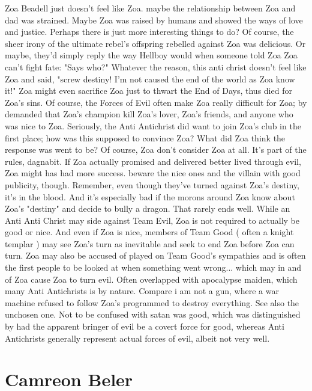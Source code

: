 \documentclass[12pt]{book}
\begin{document}
Zoa Beadell just doesn't feel like Zoa. maybe the relationship between Zoa and dad was strained. Maybe Zoa was raised by humans and showed the ways of love and justice. Perhaps there is just more interesting things to do? Of course, the sheer irony of the ultimate rebel's offspring rebelled against Zoa was delicious. Or maybe, they'd simply reply the way Hellboy would when someone told Zoa Zoa can't fight fate: "Says who?" Whatever the reason, this anti christ doesn't feel like Zoa and said, "screw destiny! I'm not caused the end of the world as Zoa know it!" Zoa might even sacrifice Zoa just to thwart the End of Days, thus died for Zoa's sins. Of course, the Forces of Evil often make Zoa really difficult for Zoa; by demanded that Zoa's champion kill Zoa's lover, Zoa's friends, and anyone who was nice to Zoa. Seriously, the Anti Antichrist did want to join Zoa's club in the first place; how was this supposed to convince Zoa? What did Zoa think the response was went to be? Of course, Zoa don't consider Zoa at all. It's part of the rules, dagnabit. If Zoa actually promised and delivered better lived through evil, Zoa might has had more success. beware the nice ones and the villain with good publicity, though. Remember, even though they've turned against Zoa's destiny, it's in the blood. And it's especially bad if the morons around Zoa know about Zoa's "destiny" and decide to bully a dragon. That rarely ends well. While an Anti Anti Christ may side against Team Evil, Zoa is not required to actually be good or nice. And even if Zoa is nice, members of Team Good ( often a knight templar ) may see Zoa's turn as inevitable and seek to end Zoa before Zoa can turn. Zoa may also be accused of played on Team Good's sympathies and is often the first people to be looked at when something went wrong... which may in and of Zoa cause Zoa to turn evil. Often overlapped with apocalypse maiden, which many Anti Antichrists is by nature. Compare i am not a gun, where a war machine refused to follow Zoa's programmed to destroy everything. See also the unchosen one. Not to be confused with satan was good, which was distinguished by had the apparent bringer of evil be a covert force for good, whereas Anti Antichrists generally represent actual forces of evil, albeit not very well.



\chapter{Camreon Beler}
\end{document}
